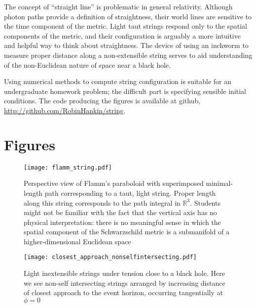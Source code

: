 \documentclass[review]{elsarticle}
\begin{document}
The concept of ``straight line'' is problematic in general relativity.
Although photon paths provide a definition of straightness, their
world lines are sensitive to the time component of the metric.  Light
taut strings respond only to the spatial components of the metric, and
their configuration is arguably a more intuitive and helpful way to
think about straightness.  The device of using an inchworm to measure
proper distance along a non-extensible string serves to aid
understanding of the non-Euclidean nature of space near a black hole.

Using numerical methods to compute string configuration is suitable
for an undergraduate homework problem; the difficult part is
specifying sensible initial conditions.  The code producing the
figures is available at github,
\url{http://github.com/RobinHankin/string}.



\clearpage

\section*{Figures}

\begin{figure}[h!] %
\centering
\texttt{[image: flamm\_string.pdf]}
\caption{Perspective view of Flamm's paraboloid with superimposed
  minimal-length path corresponding to a taut, light string.  Proper
  length along this string corresponds to the path integral in
  $\mathbb{R}^3$.  Students might not be familiar with the fact that
  the vertical axis has no physical interpretation: there is no
  meaningful sense in which the spatial component of the Schwarzschild
  metric is a submanifold of a higher-dimensional Euclidean space}
\label{flamm}
\end{figure}

\begin{figure}[p] %
\centering
\texttt{[image: closest\_approach\_nonselfintersecting.pdf]}
\caption{Light inextensible strings under tension close to a black
  hole.  Here we see non-self intersecting strings arranged by
  increasing distance of closest approach to the event horizon,
  occurring tangentially at~$\phi=0$}
\label{closest_approach_non_self_intersecting}
\end{figure}
\end{document}
